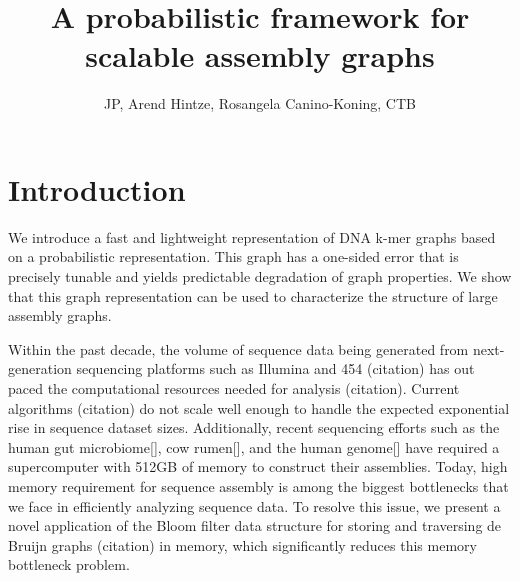 \documentclass[12pt]{article} \usepackage{simplemargins}
\begin{document}
\title{A probabilistic framework for scalable assembly graphs}
\author{JP, Arend Hintze, Rosangela Canino-Koning, CTB}

\maketitle

\section{Introduction}

We introduce a fast and lightweight representation of DNA k-mer graphs
based on a probabilistic representation.  This graph has a one-sided
error that is precisely tunable and yields predictable degradation of
graph properties.  We show that this graph representation can be used
to characterize the structure of large assembly graphs.

Within the past decade, the volume of sequence data being generated
from next-generation sequencing platforms such as Illumina and 454
(citation) has out paced the computational resources needed for
analysis (citation). Current algorithms (citation) do not scale well
enough to handle the expected exponential rise in sequence dataset
sizes. Additionally, recent sequencing efforts such as the human gut
microbiome[], cow rumen[], and the human genome[] have required a
supercomputer with 512GB of memory to construct their
assemblies. Today, high memory requirement for sequence assembly is
among the biggest bottlenecks that we face in efficiently analyzing
sequence data. To resolve this issue, we present a novel application
of the Bloom filter data structure for storing and traversing de
Bruijn graphs (citation) in memory, which significantly reduces this
memory bottleneck problem.
\end{document}
